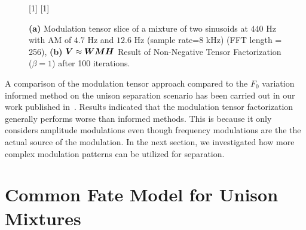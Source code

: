 \begin{figure}[!h]
\centering
[1\textwidth]{}%
\hspace{0.3\textwidth} %
[1\textwidth]{}%
\caption{\textbf{(a)} Modulation tensor slice of a mixture of two sinusoids at $440$ Hz with AM of $4.7$ Hz and $12.6$ Hz (sample rate=$8$ kHz)  (FFT length = 256), \textbf{(b)}  ${\bm{V}} \approx {\bm{W}} {\bm{M}} {\bm{H}}$ Result of Non-Negative Tensor Factorization ($\beta = 1$) after 100 iterations.}
\label{fig:am_ntf}
\end{figure}
\par
A comparison of the modulation tensor approach compared to the \(F_0\) variation informed method on the unison separation scenario has been carried out in our work published in~\cite{stoeter14}.
Results indicated that the modulation tensor factorization generally performs worse than informed methods.
This is because it only considers amplitude modulations even though frequency modulations are the
the actual source of the modulation.
In the next section, we investigated how more complex modulation patterns can be utilized for separation.

\section{Common Fate Model for Unison Mixtures}%
\label{sec:the_common_fate_model_for_unison_mixtures}


